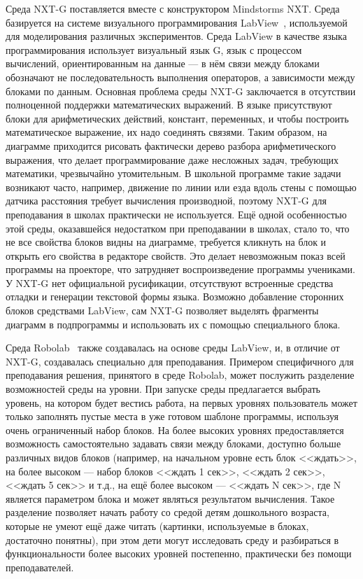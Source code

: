 Среда NXT-G поставляется вместе с конструктором Mindstorms NXT. Среда базируется на системе визуального программирования 
LabView~\cite{labview}, 
используемой для моделирования различных экспериментов. Среда LabView в качестве 
языка программирования использует визуальный язык G, язык с процессом вычислений, 
ориентированным на данные --- в нём связи между блоками обозначают не последовательность 
выполнения операторов, а зависимости между блоками по данным. Основная проблема среды NXT-G 
заключается в отсутствии полноценной поддержки математических выражений. В языке присутствуют 
блоки для арифметических действий, констант, переменных, и чтобы построить математическое
выражение, их надо соединять связями. Таким образом, на диаграмме приходится рисовать 
фактически дерево разбора арифметического выражения, что делает программирование даже 
несложных задач, требующих математики, чрезвычайно утомительным. В школьной программе 
такие задачи возникают часто, например, движение по линии или езда вдоль стены с помощью 
датчика расстояния требует вычисления производной, поэтому NXT-G для преподавания в 
школах практически не используется. Ещё одной особенностью этой среды, оказавшейся 
недостатком при преподавании в школах, стало то, что не все свойства блоков видны 
на диаграмме, требуется кликнуть на блок и открыть его свойства в редакторе свойств. 
Это делает невозможным показ всей программы на проекторе, что затрудняет воспроизведение 
программы учениками. У NXT-G нет официальной русификации, отсутствуют встроенные 
средства отладки и генерации текстовой формы языка. Возможно добавление сторонних 
блоков средствами LabView, сам NXT-G позволяет выделять фрагменты диаграмм в подпрограммы 
и использовать их с помощью специального блока.

Среда Robolab~\cite{robolabForLabview , robolabOnline}
также создавалась на основе среды LabView, и, в отличие от NXT-G, создавалась 
специально для преподавания. Примером специфичного для преподавания решения, принятого 
в среде Robolab, может послужить разделение возможностей среды на уровни. При запуске 
среды предлагается выбрать уровень, на котором будет вестись работа, на первых уровнях 
пользователь может только заполнять пустые места в уже готовом шаблоне программы, 
используя очень ограниченный набор блоков. На более высоких уровнях предоставляется 
возможность самостоятельно задавать связи между блоками, доступно больше различных 
видов блоков (например, на начальном уровне есть блок <<ждать>>, на более высоком --- 
набор блоков <<ждать 1 сек>>, <<ждать 2 сек>>, <<ждать 5 сек>> и т.д., на ещё более 
высоком --- <<ждать N сек>>, где N является параметром блока и может являться результатом 
вычисления. Такое разделение позволяет начать работу со средой детям дошкольного возраста, 
которые не умеют ещё даже читать (картинки, используемые в блоках, достаточно понятны), 
при этом дети могут исследовать среду и разбираться в функциональности более высоких 
уровней постепенно, практически без помощи преподавателей.

